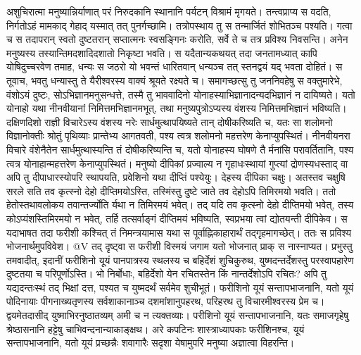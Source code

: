 \vakya अशुचिरात्मा मनुष्यान्निर्याणात् परं निरुदकानि स्थानानि पर्यटन् विश्रामं मृगयते। तन्त्वप्राप्य स वदति, निर्गतोऽहं मामकाद् गेहाद् यस्मात् तत् पुनर्गच्छामि।
\vakya तत्रोपस्थाय तु स तन्मार्जितं शोभितञ्च पश्यति।
\vakya गत्वा च स तदापरान् स्वतो दुष्टतरान् सप्तात्मनः स्वसङ्गिनः करोति, सर्वे ते च तत्र प्रविश्य निवसन्ति। अनेन मनुष्यस्य तस्यान्तिमदशादिदशातो निकृष्टा भवति।
\vakya स यदैतान्यकथयत् तदा जनतामध्यात् कापि योषिदुच्चरवेण तमाह, धन्यः स जठरो यो भवन्तं धारितवान् धन्यञ्च तत् स्तनद्वयं यद् भवता दोहितं।
\vakya स तूवाच, भवतु धन्यास्तु ते यैरीश्वरस्य वाक्यं श्रूयते रक्ष्यते च।
\vakya समागच्छत्सु तु जननिवहेषु स वक्तुमारेभे, वंशोऽयं दुष्टः, सोऽभिज्ञानमनुसन्धत्ते, तस्मै तु भाववादिनो योनाहस्याभिज्ञानादन्यदभिज्ञानं न दायिष्यते।
\vakya यतो योनाहो यथा नीनवीयानां निमित्तमभिज्ञानमभूत्, तथा मनुष्यपुत्रोऽप्यस्य वंशस्य निमित्तमभिज्ञानं भविष्यति।
\vakya दक्षिणदिशो राज्ञी विचारेऽस्य वंशस्य नरेः सार्धमुत्थापयिष्यते तान् दोषीकरिष्यति च, यतः सा शलोमनो विज्ञानोक्तीः श्रोतुं पृथिव्याः प्रान्तेभ्य आगतवती, पश्य त्वत्र शलोमनो महत्तरेण केनाप्युपस्थितं।
\vakya नीनवीयनरा विचारे वंशेनैतेन सार्धमुत्थास्यन्ति तं दोषीकरिष्यन्ति च, यतो योनाहस्य घोषणे तै र्मनांसि परावर्तितानि, पश्य त्वत्र योनाहान्महत्तरेण केनाप्युपस्थितं।
\vakya मनुष्यो दीपिकां प्रज्वाल्य न गृहाधःस्थायां गुप्त्यां द्रोणस्यधस्ताद् वा अपि तु दीपाधारस्योपरि स्थापयति, प्रवेशिनो यथा दीप्तिं पश्येयुः।
\vakya देहस्य दीपिका चक्षुः। अतस्तव चक्षुषि सरले सति तव कृत्स्नो देहो दीप्तिमयोऽस्ति, तस्मिंस्तु दुष्टे जाते तव देहोऽपि तिमिरमयो भवति।
\vakya ततो हेतोस्तथावलोकय तवान्तर्ज्योति र्यथा न तिमिरमयं भवेत्।
\vakya तद् यदि तव कृत्स्नो देहो दीप्तिमयो भवेत्, तस्य कोऽप्यंशस्तिमिरमयो न भवेत्, तर्हि तत्सर्वाङ्गं दीप्तिमयं भविष्यति, स्वप्रभया त्वां द्योतयन्ती दीपिकेव।
\vakya स यदाभाषत तदा फरीशी कश्चित् तं निमन्त्रयामास यथा स पूर्वाह्निकाहारार्थं तद्गृहमागच्छेत्। ततः स प्रविश्य भोजनार्थमुपविवेश।
@V तद् दृष्ट्वा स फरीशी विस्मयं जगाम यतो भोजनात् प्राक् स नास्नाप्यत।
\vakya प्रभुस्तु तमवादीत्, इदानीं फरीशिनो यूयं पानपात्रस्य स्थलस्य च बहिर्देशं शुचिकुरुथ, युष्मदन्तर्देशस्तु परस्वापहारेण दुष्टतया च परिपूर्णोऽस्ति।
\vakya भो निर्बोधाः, बहिर्देशो येन रचितस्तेन किं नान्तर्देशोऽपि रचितः?
\vakya अपि तु यद्यदन्तःस्थं तद् भिक्षां दत्त, पश्यत च युष्मदर्थं सर्वमेव शुचीभूतं।
\vakya फरीशिनो यूयं सन्तापभाजनानि, यतो यूयं पोदिनायाः पीगनाख्यतृणस्य सर्वशाकानाञ्च दशमांशानुपहरथ, परिहरथ तु विचारमीश्वरस्य प्रेम च। द्वयमेतदासीद् युष्माभिरनुष्ठातव्यम् अमी च न त्यक्तव्याः।
\vakya परीशिनो यूयं सन्तापभाजनानि, यतः समाजगृहेषु श्रेष्ठासनानि हट्टेषु चाभिवन्दनान्याकाङ्क्षथ।
\vakya अरे कपटिनः शास्त्राध्यापकाः फरीशिनश्च, यूयं सन्तापभाजनानि, यतो यूयं प्रच्छन्नैः शवागारैः सदृशा येषामुपरि मनुष्या अज्ञात्वा विहरन्ति।
